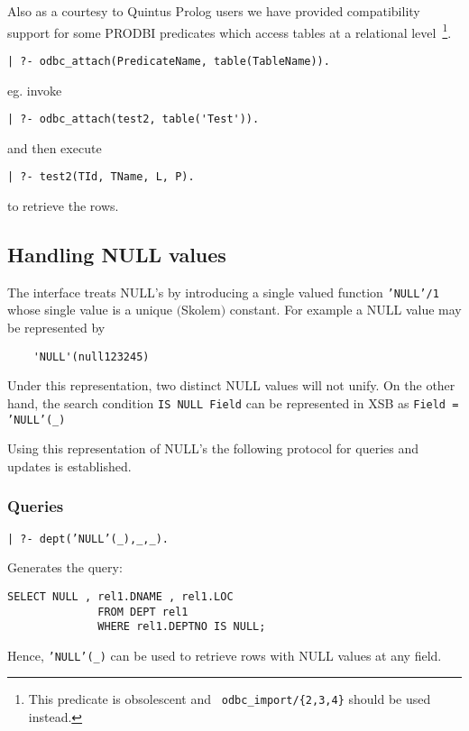 Also as a courtesy to Quintus Prolog users we have provided
compatibility support for some PRODBI predicates which access tables
at a relational level~\footnote{This predicate is obsolescent and {\tt
odbc\_import/\{2,3,4\}} should be used instead.}.

\begin{verbatim}
| ?- odbc_attach(PredicateName, table(TableName)).
\end{verbatim}

eg. invoke 
\begin{verbatim}
| ?- odbc_attach(test2, table('Test')).
\end{verbatim}
and then execute 
\begin{verbatim}
| ?- test2(TId, TName, L, P).
\end{verbatim}
to retrieve the rows.


\subsection{Handling NULL values}\label{NULL-values}

The interface treats NULL's by introducing a single valued function
{\tt 'NULL'/1} whose single value is a unique $($Skolem$)$ constant.
For example a NULL value may be represented by 
\begin{verbatim}
	'NULL'(null123245) 
\end{verbatim} 
Under this representation, two distinct NULL values will not unify.
On the other hand, the search condition {\tt IS NULL Field} can be
represented in XSB as {\tt Field = 'NULL'(\_)}

Using this representation of NULL's the following protocol for queries
and updates is established.

\subsubsection{Queries}
%
\begin{center}

{\tt | ?- dept('NULL'(\_),\_,\_).}
\end{center}

Generates the query: 


\begin{verbatim}
SELECT NULL , rel1.DNAME , rel1.LOC
			  FROM DEPT rel1
			  WHERE rel1.DEPTNO IS NULL;
\end{verbatim}

Hence, {\tt 'NULL'(\_)} can be used to retrieve rows with NULL values 
at any field.

